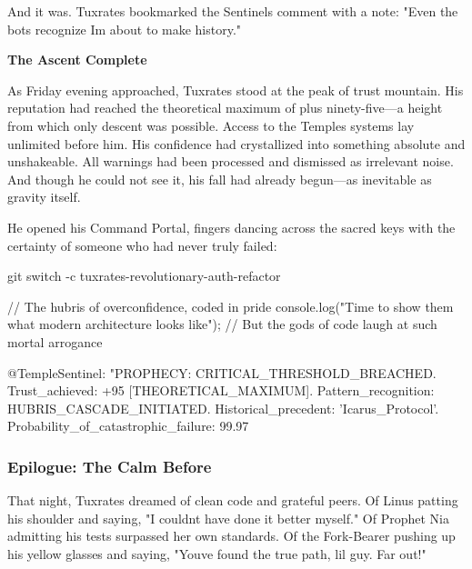 And it was. Tuxrates bookmarked the Sentinel\textquotesingle s comment with a note: "Even the bots recognize I\textquotesingle m about to make history."

\textbf{The Ascent Complete}

As Friday evening approached, Tuxrates stood at the peak of trust mountain. His reputation had reached the theoretical maximum of plus ninety-five---a height from which only descent was possible. Access to the Temple\textquotesingle s systems lay unlimited before him. His confidence had crystallized into something absolute and unshakeable. All warnings had been processed and dismissed as irrelevant noise. And though he could not see it, his fall had already begun---as inevitable as gravity itself.

He opened his Command Portal, fingers dancing across the sacred keys with the certainty of someone who had never truly failed:

\begin{codeblock}
git switch -c tuxrates-revolutionary-auth-refactor
\end{codeblock}

\begin{codeblock}
// The hubris of overconfidence, coded in pride
console.log("Time to show them what modern architecture looks like");
// But the gods of code laugh at such mortal arrogance
\end{codeblock}

\begin{codeblock}
@TempleSentinel: "PROPHECY: CRITICAL_THRESHOLD_BREACHED. Trust_achieved: +95 [THEORETICAL_MAXIMUM]. Pattern_recognition: HUBRIS_CASCADE_INITIATED. Historical_precedent: 'Icarus_Protocol'. Probability_of_catastrophic_failure: 99.97%
\end{codeblock}

\bookdivider

\subsubsection{Epilogue: The Calm Before}\label{epilogue-the-calm-before}

That night, Tuxrates dreamed of clean code and grateful peers. Of Linus patting his shoulder and saying, "I couldn\textquotesingle t have done it better myself." Of Prophet Nia admitting his tests surpassed her own standards. Of the Fork-Bearer pushing up his yellow glasses and saying, "You\textquotesingle ve found the true path, lil\textquotesingle{} guy. Far out!"

